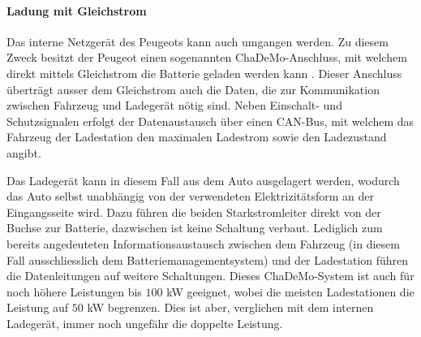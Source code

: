 \paragraph{Ladung mit Gleichstrom}
Das interne Netzgerät des Peugeots kann auch umgangen werden. Zu diesem Zweck besitzt der Peugeot einen sogenannten ChaDeMo-Anschluss, mit welchem direkt mittels Gleichstrom die Batterie geladen werden kann \cite{chademo}. Dieser Anschluss überträgt ausser dem Gleichstrom auch die Daten, die zur Kommunikation zwischen Fahrzeug und Ladegerät nötig sind. Neben Einschalt- und Schutzsignalen erfolgt der Datenaustausch über einen CAN-Bus, mit welchem das Fahrzeug der Ladestation den maximalen Ladestrom sowie den Ladezustand angibt.

Das Ladegerät kann in diesem Fall aus dem Auto ausgelagert werden, wodurch das Auto selbst unabhängig von der verwendeten Elektrizitätsform an der Eingangsseite wird. Dazu führen die beiden Starkstromleiter direkt von der Buchse zur Batterie, dazwischen ist keine Schaltung verbaut. Lediglich zum bereits angedeuteten Informationsaustausch zwischen dem Fahrzeug (in diesem Fall ausschliesslich dem Batteriemanagementsystem) und der Ladestation führen die Datenleitungen auf weitere Schaltungen. Dieses ChaDeMo-System ist auch für noch höhere Leistungen bis $100$ kW geeignet, wobei die meisten Ladestationen die Leistung auf $50$ kW begrenzen. Dies ist aber, verglichen mit dem internen Ladegerät, immer noch ungefähr die doppelte Leistung.